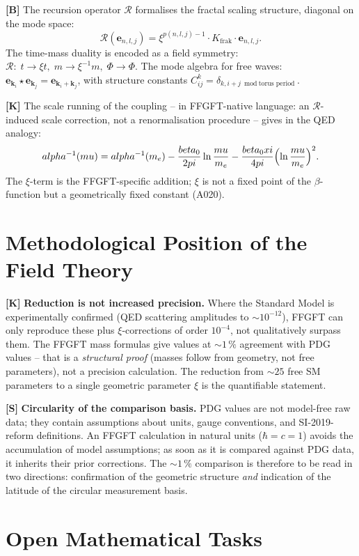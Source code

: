 \textbf{[B]} The recursion operator $\mathcal R$ formalises the fractal scaling
structure, diagonal on the mode space:
\[
  \mathcal R(\mathbf e_{n,l,j}) = \xi^{p(n,l,j)-1}\cdot K_\text{frak}\cdot\mathbf e_{n,l,j}.
\]
The time-mass duality is encoded as a field symmetry:
$\mathcal R:\;t\to\xi t,\;m\to\xi^{-1}m,\;\Phi\to\Phi$. The mode algebra for
free waves: $\mathbf e_{\mathbf k_i}\star\mathbf e_{\mathbf k_j}
=\mathbf e_{\mathbf k_i+\mathbf k_j}$, with structure constants
$C_{ij}^k=\delta_{k,i+j\bmod\text{torus period}}$.

\textbf{[K]} The scale running of the coupling -- in FFGFT-native language: an
$\mathcal R$-induced scale correction, not a renormalisation procedure -- gives
in the QED analogy:
\[
  \alpha^{-1}(\mu) = \alpha^{-1}(m_e)
  - \frac{\beta_0}{2\pi}\ln\frac\mu{m_e}
  - \frac{\beta_0\xi}{4\pi}\Bigl(\ln\frac\mu{m_e}\Bigr)^2.
\]
The $\xi$-term is the FFGFT-specific addition; $\xi$ is not a fixed point of
the $\beta$-function but a geometrically fixed constant (A020).

\section{Methodological Position of the Field Theory}

\textbf{[K]} \textbf{Reduction is not increased precision.} Where the Standard
Model is experimentally confirmed (QED scattering amplitudes to $\sim10^{-12}$),
FFGFT can only reproduce these plus $\xi$-corrections of order $10^{-4}$, not
qualitatively surpass them. The FFGFT mass formulas give values at $\sim1\,\%$
agreement with PDG values -- that is a \emph{structural proof} (masses follow
from geometry, not free parameters), not a precision calculation. The reduction
from $\sim25$ free SM parameters to a single geometric parameter $\xi$ is the
quantifiable statement.

\textbf{[S]} \textbf{Circularity of the comparison basis.} PDG values are not
model-free raw data; they contain assumptions about units, gauge conventions, and
SI-2019-reform definitions. An FFGFT calculation in natural units ($\hbar=c=1$)
avoids the accumulation of model assumptions; as soon as it is compared against
PDG data, it inherits their prior corrections. The $\sim1\,\%$ comparison is
therefore to be read in two directions: confirmation of the geometric structure
\emph{and} indication of the latitude of the circular measurement basis.

\section{Open Mathematical Tasks}

